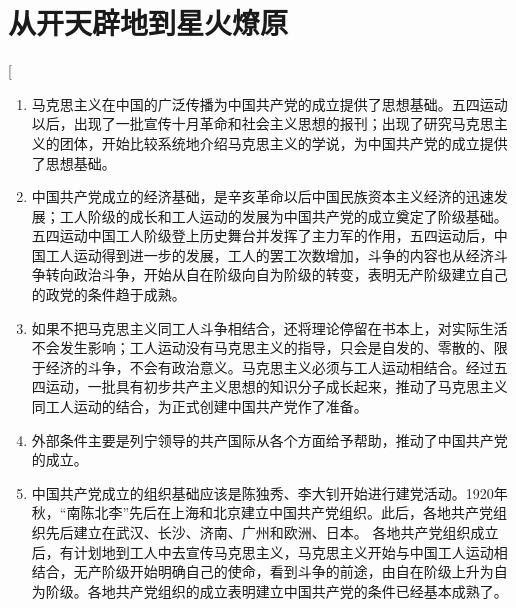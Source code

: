\section{从开天辟地到星火燎原}
\begin{enumerate}
	\question[为什么说新文化运动是近代中国一次伟大的思想启蒙运动？]
	\question[为什么说中国共产党的成立是历史的必然？]
	\ans[
		\begin{enumerate}
			\item 马克思主义在中国的广泛传播为中国共产党的成立提供了思想基础。五四运动以后，出现了一批宣传十月革命和社会主义思想的报刊；出现了研究马克思主义的团体，开始比较系统地介绍马克思主义的学说，为中国共产党的成立提供了思想基础。
			\item 中国共产党成立的经济基础，是辛亥革命以后中国民族资本主义经济的迅速发展；工人阶级的成长和工人运动的发展为中国共产党的成立奠定了阶级基础。五四运动中国工人阶级登上历史舞台并发挥了主力军的作用，五四运动后，中国工人运动得到进一步的发展，工人的罢工次数增加，斗争的内容也从经济斗争转向政治斗争，开始从自在阶级向自为阶级的转变，表明无产阶级建立自己的政党的条件趋于成熟。
			\item 如果不把马克思主义同工人斗争相结合，还将理论停留在书本上，对实际生活不会发生影响；工人运动没有马克思主义的指导，只会是自发的、零散的、限于经济的斗争，不会有政治意义。马克思主义必须与工人运动相结合。经过五四运动，一批具有初步共产主义思想的知识分子成长起来，推动了马克思主义同工人运动的结合，为正式创建中国共产党作了准备。
			\item 外部条件主要是列宁领导的共产国际从各个方面给予帮助，推动了中国共产党的成立。
			\item 中国共产党成立的组织基础应该是陈独秀、李大钊开始进行建党活动。1920年秋，“南陈北李”先后在上海和北京建立中国共产党组织。此后，各地共产党组织先后建立在武汉、长沙、济南、广州和欧洲、日本。 各地共产党组织成立后，有计划地到工人中去宣传马克思主义，马克思主义开始与中国工人运动相结合，无产阶级开始明确自己的使命，看到斗争的前途，由自在阶级上升为自为阶级。各地共产党组织的成立表明建立中国共产党的条件已经基本成熟了。
		\end{enumerate}
		

\end{enumerate}
